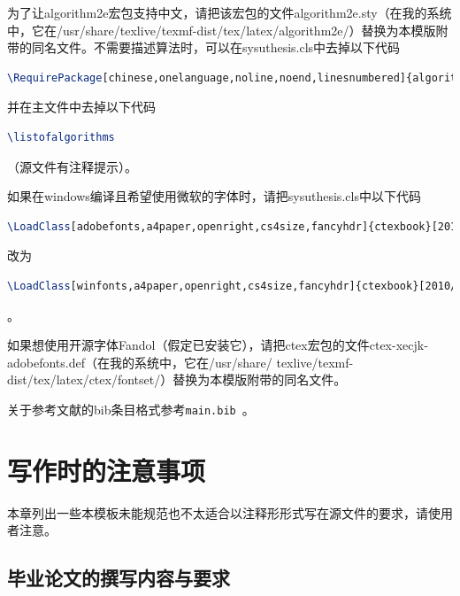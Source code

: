\documentclass{sysuthesis}
\begin{document}
为了让{\ttfamily algorithm2e}宏包支持中文，请把该宏包的文件{\ttfamily algorithm2e.sty}（在我的系统中，它在{\ttfamily /usr/share/texlive/texmf-dist/tex/latex/algorithm2e/}）替换为本模版附带的同名文件。不需要描述算法时，可以在{\ttfamily sysuthesis.cls}中去掉以下代码
\begin{lstlisting}[language=TeX, keywordstyle=\color{blue}\bfseries, basicstyle=\ttfamily, breaklines=true, frame=shadowbox]
\RequirePackage[chinese,onelanguage,noline,noend,linesnumbered]{algorithm2e}
\end{lstlisting}
并在主文件中去掉以下代码
\begin{lstlisting}[language=TeX, keywordstyle=\color{blue}\bfseries, basicstyle=\ttfamily, breaklines=true, frame=shadowbox]
\listofalgorithms
\end{lstlisting}
（源文件有注释提示）。

如果在windows编译且希望使用微软的字体时，请把{\ttfamily sysuthesis.cls}中以下代码
\begin{lstlisting}[language=TeX, keywordstyle=\color{blue}\bfseries, basicstyle=\ttfamily, breaklines=true, frame=shadowbox]
\LoadClass[adobefonts,a4paper,openright,cs4size,fancyhdr]{ctexbook}[2010/01/22]
\end{lstlisting}
改为
\begin{lstlisting}[language=TeX, keywordstyle=\color{blue}\bfseries, basicstyle=\ttfamily, breaklines=true, frame=shadowbox]
\LoadClass[winfonts,a4paper,openright,cs4size,fancyhdr]{ctexbook}[2010/01/22]
\end{lstlisting}。

如果想使用开源字体{\ttfamily Fandol}（假定已安装它），请把{\ttfamily ctex}宏包的文件{\ttfamily ctex-xecjk-adobefonts.def}（在我的系统中，它在{\ttfamily /usr/share/ texlive/texmf-dist/tex/latex/ctex/fontset/}）替换为本模版附带的同名文件。

关于参考文献的bib条目格式参考\texttt{main.bib}~\cite{article}\cite{book}\cite{phdthesis}\cite{inproc}\cite{masterthesis}\cite{manual}\cite{report}\cite{database}\cite{software}\cite{standard}\cite{newspaper}\cite{patent}。

\chapter{写作时的注意事项}

本章列出一些本模板未能规范也不太适合以注释形形式写在源文件的要求，请使用者注意。

\section{毕业论文的撰写内容与要求}
\end{document}
